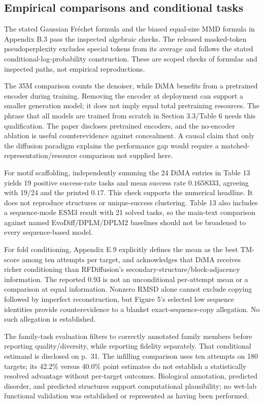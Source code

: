 \documentclass[10pt]{article}
\begin{document}
\subsection*{Empirical comparisons and conditional tasks}
The stated Gaussian Fréchet formula and the biased equal-size MMD formula in Appendix B.3 pass the inspected algebraic checks. The released masked-token pseudoperplexity excludes special tokens from its average and follows the stated conditional-log-probability construction. These are scoped checks of formulas and inspected paths, not empirical reproductions.\par
The 35M comparison counts the denoiser, while DiMA benefits from a pretrained encoder during training. Removing the encoder at deployment can support a smaller generation model; it does not imply equal total pretraining resources. The phrase that all models are trained from scratch in Section 3.3/Table 6 needs this qualification. The paper discloses pretrained encoders, and the no-encoder ablation is useful counterevidence against concealment. A causal claim that only the diffusion paradigm explains the performance gap would require a matched-representation/resource comparison not supplied here.\par
For motif scaffolding, independently summing the 24 DiMA entries in Table 13 yields 19 positive success-rate tasks and mean success rate \(0.1658333\), agreeing with 19/24 and the printed \(0.17\). This check supports the numerical headline. It does not reproduce structures or unique-success clustering. Table 13 also includes a sequence-mode ESM3 result with 21 solved tasks, so the main-text comparison against named EvoDiff/DPLM/DPLM2 baselines should not be broadened to every sequence-based model.\par
For fold conditioning, Appendix E.9 explicitly defines the mean as the best TM-score among ten attempts per target, and acknowledges that DiMA receives richer conditioning than RFDiffusion’s secondary-structure/block-adjacency information. The reported \(0.93\) is not an unconditional per-attempt mean or a comparison at equal information. Nonzero RMSD alone cannot exclude copying followed by imperfect reconstruction, but Figure 5’s selected low sequence identities provide counterevidence to a blanket exact-sequence-copy allegation. No such allegation is established.\par
The family-task evaluation filters to correctly annotated family members before reporting quality/diversity, while reporting fidelity separately. That conditional estimand is disclosed on p. 31. The infilling comparison uses ten attempts on 180 targets; its 42.2\% versus 40.0\% point estimates do not establish a statistically resolved advantage without per-target outcomes. Biological annotation, predicted disorder, and predicted structures support computational plausibility; no wet-lab functional validation was established or represented as having been performed.\par
\end{document}
